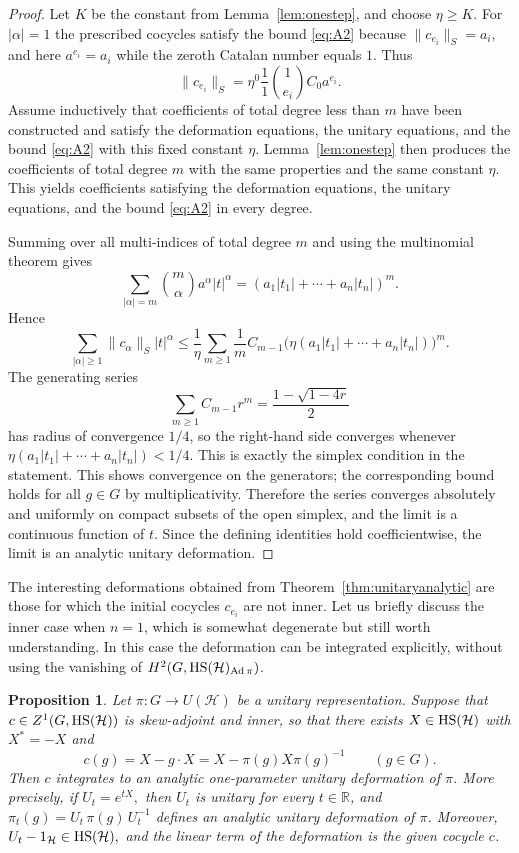 \documentclass[12pt]{amsproc}
\theoremstyle{plain}
\newtheorem{proposition}[theorem]{Proposition}
\theoremstyle{definition}
\numberwithin{equation}{section}
\newcommand{\HS}{{\rm HS}}
\DeclareMathOperator{\Ad}{Ad}
\begin{document}
\begin{proof}
Let $K$ be the constant from Lemma~\ref{lem:onestep}, and choose $\eta\ge K$. For $|\alpha|=1$ the prescribed cocycles satisfy the bound \eqref{eq:A2} because
$
\|c_{e_i}\|_S=a_i,
$  
and here $a^{e_i}=a_i$ while the zeroth Catalan number equals $1$. Thus
\[
\|c_{e_i}\|_S=\eta^{0}\frac{1}{1}\binom{1}{e_i}C_{0}a^{e_i}.
\]
Assume inductively that coefficients of total degree less than $m$ have been constructed and satisfy the deformation equations, the unitary equations, and the bound \eqref{eq:A2} with this fixed constant $\eta$. Lemma~\ref{lem:onestep} then produces the coefficients of total degree $m$ with the same properties and the same constant $\eta$. This yields coefficients satisfying the deformation equations, the unitary equations, and the bound \eqref{eq:A2} in every degree.

Summing over all multi-indices of total degree $m$ and using the multinomial theorem gives
\[
\sum_{|\alpha|=m}\binom{m}{\alpha}a^\alpha|t|^\alpha
=(a_1|t_1|+\cdots+a_n|t_n|)^m.
\]
Hence
\[
\sum_{|\alpha|\ge 1}\|c_\alpha\|_S|t|^\alpha
\le \frac{1}{\eta}\sum_{m\ge 1}\frac{1}{m}C_{m-1}\bigl(\eta(a_1|t_1|+\cdots+a_n|t_n|)\bigr)^m.
\]
The generating series
\[
\sum_{m\ge 1}C_{m-1}r^m=\frac{1-\sqrt{1-4r}}{2}
\]
has radius of convergence $1/4$, so the right-hand side converges whenever $\eta(a_1|t_1|+\cdots+a_n|t_n|)<1/4$. This is exactly the simplex condition in the statement. This shows convergence on the generators; the corresponding bound holds for all $g\in G$ by multiplicativity. Therefore the series converges absolutely and uniformly on compact subsets of the open simplex, and the limit is a continuous function of $t$.
Since the defining identities hold coefficientwise, the limit is an analytic unitary deformation.
\end{proof}

The interesting deformations obtained from Theorem~\ref{thm:unitaryanalytic} are those for which the initial cocycles $c_{e_i}$ are not inner. Let us briefly discuss the inner case when $n=1$, which is somewhat degenerate but still worth understanding. In this case the deformation can be integrated explicitly, without using the vanishing of $H^2(G,\HS(\mathcal H)_{\Ad\pi})$.

\begin{proposition}
\label{prop:inner}
Let $\pi\colon G\to U(\mathcal H)$ be a unitary representation. Suppose that
$c\in Z^1(G,\HS(\mathcal H))$ is skew-adjoint and inner, so that there exists
$X\in \HS(\mathcal H)$ with $X^*=-X$ and
\[
c(g)=X-g\cdot X=X-\pi(g)X\pi(g)^{-1}
\qquad (g\in G).
\]
Then $c$ integrates to an analytic one-parameter unitary deformation of $\pi$.
More precisely, if
$
U_t=e^{tX},
$
then $U_t$ is unitary for every $t\in \mathbb R$, and
$
\pi_t(g)=U_t\,\pi(g)\,U_t^{-1}
$
defines an analytic unitary deformation of $\pi$. Moreover,
$
U_t- 1_{\mathcal H} \in \HS(\mathcal H),
$
and the linear term of the deformation is the given cocycle $c$.
\end{proposition}
\end{document}
